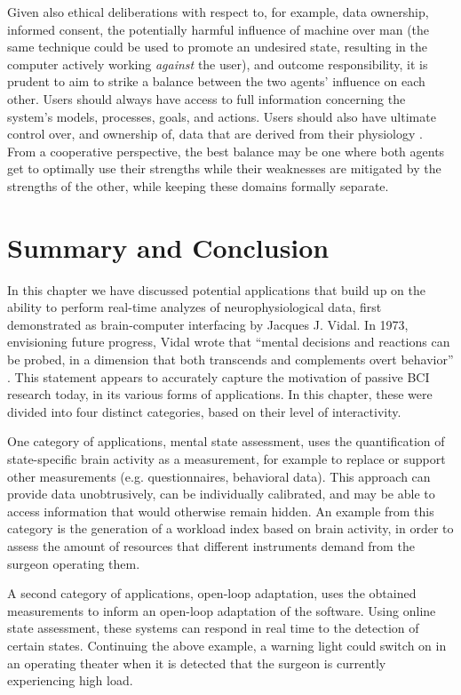 Given also ethical deliberations with respect to, for example, data ownership, informed consent, the potentially harmful influence of machine over man (the same technique could be used to promote an undesired state, resulting in the computer actively working \emph{against} the user), and outcome responsibility, it is prudent to aim to strike a balance between the two agents' influence on each other. Users should always have access to full information concerning the system's models, processes, goals, and actions. Users should also have ultimate control over, and ownership of, data that are derived from their physiology \cite{fairclough2014confidential}. From a cooperative perspective, the best balance may be one where both agents get to optimally use their strengths while their weaknesses are mitigated by the strengths of the other, while keeping these domains formally separate.


\section{Summary and Conclusion}
In this chapter we have discussed potential applications that build up on the ability to perform real-time analyzes of neurophysiological data, first demonstrated as brain-computer interfacing by Jacques J. Vidal. In 1973, envisioning future progress, Vidal wrote that ``mental decisions and reactions can be probed, in a dimension that both transcends and complements overt behavior'' \cite{vidal1973direct}. This statement appears to accurately capture the motivation of passive BCI research today, in its various forms of applications. In this chapter, these were divided into four distinct categories, based on their level of interactivity.

One category of applications, mental state assessment, uses the quantification of state-specific brain activity as a measurement, for example to replace or support other measurements (e.g. questionnaires, behavioral data). This approach can provide data unobtrusively, can be individually calibrated, and may be able to access information that would otherwise remain hidden. An example from this category is the generation of a workload index based on brain activity, in order to assess the amount of resources that different instruments demand from the surgeon operating them. 

A second category of applications, open-loop adaptation, uses the obtained measurements to inform an open-loop adaptation of the software. Using online state assessment, these systems can respond in real time to the detection of certain states. Continuing the above example, a warning light could switch on in an operating theater when it is detected that the surgeon is currently experiencing high load.

